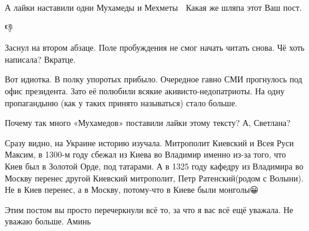 \begin{itemize}
А лайки наставили одни Мухамеды и Мехметы 🤣 Какая же шляпа этот Ваш пост.

 
👎

 
Заснул на втором абзаце. Поле пробуждения не смог начать читать снова. Чё хоть
написала? Вкратце.


Вот идиотка. В полку упоротых прибыло. Очередное гавно СМИ прогнулось под офис
президента. Зато её полюбили всякие акивисто-недопатриоты. На одну пропагандыню
(как у таких принято называться) стало больше.

 
Почему так много «Мухамедов» поставили лайки этому тексту? А, Светлана?

\par
 
Сразу видно, на Украине историю изучала. Митрополит Киевский и Всея Руси
Максим, в 1300-м году сбежал из Киева во Владимир именно из-за того, что Киев
был в Золотой Орде, под татарами. А в 1325 году кафедру из Владимира во Москву
перенес другой Киевский митрополит, Петр Ратенский(родом с Волыни). Не в Киев
перенес, а в Москву, потому-что в Киеве были монголы😀


Этим постом вы просто перечеркнули всё то, за что я вас всё ещё уважала. Не
уважаю больше. Аминь


\end{itemize}
